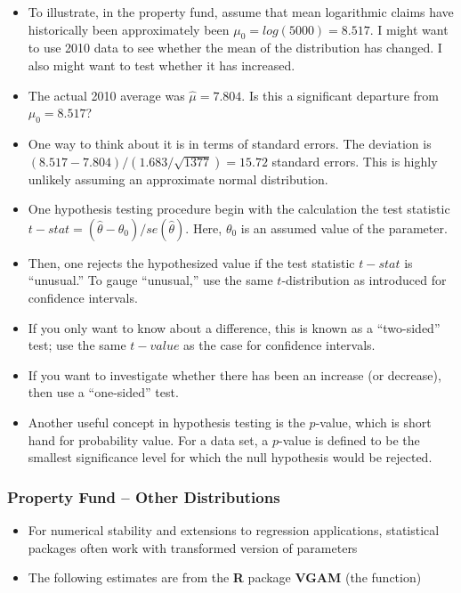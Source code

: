 \documentclass[]{book}
\begin{document}
\begin{itemize}
\item
  To illustrate, in the property fund, assume that mean logarithmic
  claims have historically been approximately been
  \(\mu_0 = log(5000)= 8.517\). I might want to use 2010 data to see
  whether the mean of the distribution has changed. I also might want to
  test whether it has increased.
\item
  The actual 2010 average was \(\hat{\mu} =7.804\). Is this a
  significant departure from \(\mu_0 = 8.517\)?
\item
  One way to think about it is in terms of standard errors. The
  deviation is \((8.517-7.804)/(1.683/\sqrt{1377}) = 15.72\) standard
  errors. This is highly unlikely assuming an approximate normal
  distribution.
\item
  One hypothesis testing procedure begin with the calculation the test
  statistic \(t-stat=(\hat{\theta}-\theta_0)/se(\hat{\theta})\). Here,
  \(\theta_0\) is an assumed value of the parameter.
\item
  Then, one rejects the hypothesized value if the test statistic
  \(t-stat\) is ``unusual.'' To gauge ``unusual,'' use the same
  \(t\)-distribution as introduced for confidence intervals.
\item
  If you only want to know about a difference, this is known as a
  ``two-sided'' test; use the same \(t-value\) as the case for
  confidence intervals.
\item
  If you want to investigate whether there has been an increase (or
  decrease), then use a ``one-sided'' test.
\item
  Another useful concept in hypothesis testing is the \(p\)-value, which
  is short hand for probability value. For a data set, a \(p\)-value is
  defined to be the smallest significance level for which the null
  hypothesis would be rejected.
\end{itemize}

\subsubsection{Property Fund -- Other
Distributions}\label{property-fund-other-distributions}

\begin{itemize}
\item
  For numerical stability and extensions to regression applications,
  statistical packages often work with transformed version of parameters
\item
  The following estimates are from the \textbf{R} package \textbf{VGAM}
  (the function)
\end{itemize}
\end{document}
